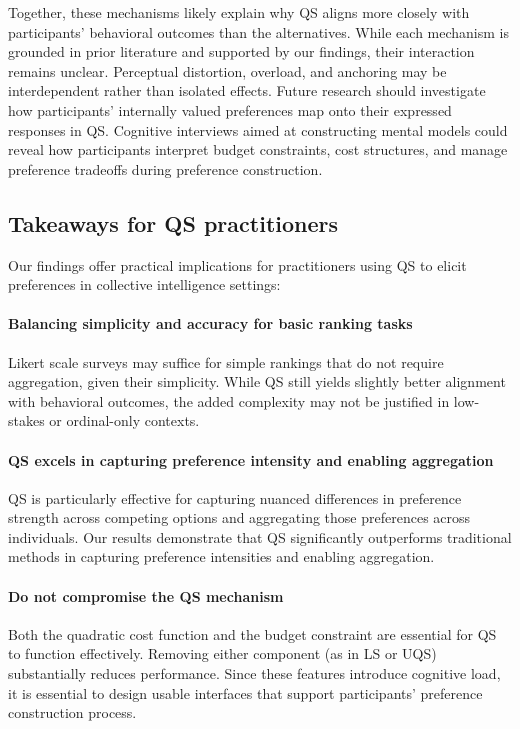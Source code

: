 Together, these mechanisms likely explain why QS aligns more closely with participants' behavioral outcomes than the alternatives. While each mechanism is grounded in prior literature and supported by our findings, their interaction remains unclear. Perceptual distortion, overload, and anchoring may be interdependent rather than isolated effects. Future research should investigate how participants' internally valued preferences map onto their expressed responses in QS. Cognitive interviews aimed at constructing mental models could reveal how participants interpret budget constraints, cost structures, and manage preference tradeoffs during preference construction.

\subsection{Takeaways for QS practitioners}
Our findings offer practical implications for practitioners using QS to elicit preferences in collective intelligence settings:

\paragraph{Balancing simplicity and accuracy for basic ranking tasks}
Likert scale surveys may suffice for simple rankings that do not require aggregation, given their simplicity. While QS still yields slightly better alignment with behavioral outcomes, the added complexity may not be justified in low-stakes or ordinal-only contexts.

\paragraph{QS excels in capturing preference intensity and enabling aggregation}
QS is particularly effective for capturing nuanced differences in preference strength across competing options and aggregating those preferences across individuals. Our results demonstrate that QS significantly outperforms traditional methods in capturing preference intensities and enabling aggregation.

\paragraph{Do not compromise the QS mechanism}
Both the quadratic cost function and the budget constraint are essential for QS to function effectively. Removing either component (as in LS or UQS) substantially reduces performance. Since these features introduce cognitive load, it is essential to design usable interfaces that support participants' preference construction process.

